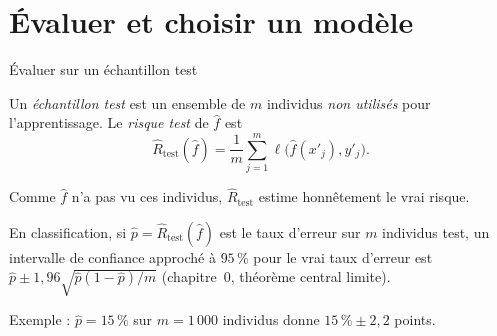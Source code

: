 \documentclass[aspectratio=169,11pt]{beamer}
\begin{document}
\section{Évaluer et choisir un modèle}

\begin{frame}{Évaluer sur un échantillon test}
  \begin{definition}
    Un \emph{échantillon test} est un ensemble de $m$ individus \emph{non utilisés} pour l'apprentissage. Le \emph{risque test} de $\hat f$ est
    \[
      \widehat R_{\mathrm{test}}(\hat f)=\frac1m\sum_{j=1}^m\ell\big(\hat f(x'_j),y'_j\big).
    \]
  \end{definition}
  Comme $\hat f$ n'a pas vu ces individus, $\widehat R_{\mathrm{test}}$ estime honnêtement le vrai risque.
  \begin{proposition}
    En classification, si $\hat p=\widehat R_{\mathrm{test}}(\hat f)$ est le taux d'erreur sur $m$ individus test, un intervalle de confiance approché à $95\,\%$ pour le vrai taux d'erreur est
    $\hat p\pm1{,}96\sqrt{\hat p(1-\hat p)/m}$ (chapitre~0, théorème central limite).
  \end{proposition}
  {\small\color{cnfGris}Exemple : $\hat p=15\,\%$ sur $m=1\,000$ individus donne $15\,\%\pm2{,}2$ points.}
\end{frame}
\end{document}
